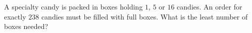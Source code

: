 A specialty candy is packed in boxes holding $1$, $5$ or $16$ candies. An order for exactly $238$ candies must be filled with full boxes. What is the least number of boxes needed?
